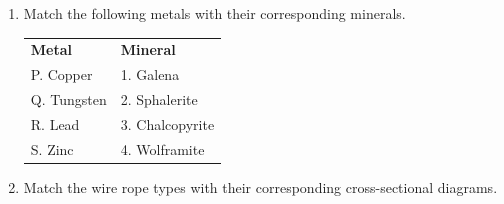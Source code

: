 \documentclass[journal,12pt,onecolumn]{IEEEtran}
\theoremstyle{remark}
\begin{document}
\begin{enumerate}
\item Match the following metals with their corresponding minerals.
\begin{center}
\begin{tabular}{ll}
\textbf{Metal} & \textbf{Mineral} \\
P. Copper & 1. Galena \\
Q. Tungsten & 2. Sphalerite \\
R. Lead & 3. Chalcopyrite \\
S. Zinc & 4. Wolframite \\
\end{tabular}
\end{center}

\hfill{}

\begin{enumerate}
\end{enumerate}

\item Match the wire rope types with their corresponding cross-sectional diagrams.


\end{enumerate}
\end{document}
